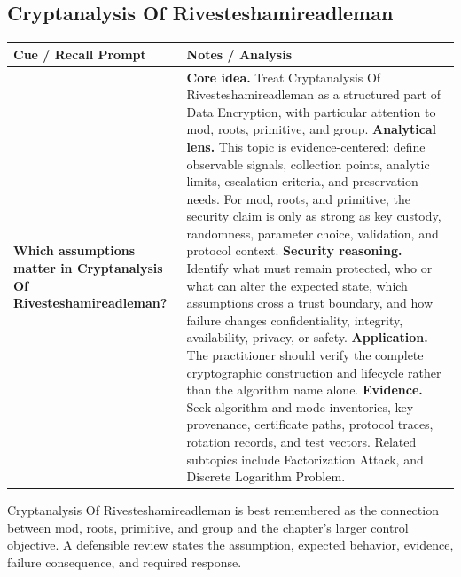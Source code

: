 \documentclass[11pt]{article}
\newcommand{\CornellHeader}{%
\rowcolor{Navy}\color{white}\bfseries Cue / Recall Prompt & \color{white}\bfseries Notes / Analysis\\\hline}
\newcommand{\CornellRow}[2]{%
\cellcolor{CueGray}\RaggedRight\textbf{#1} & \RaggedRight #2\\\hline}
\begin{document}
\subsection*{Cryptanalysis Of Rivesteshamireadleman}
\begin{longtable}{>{\RaggedRight\arraybackslash}p{}|>{\RaggedRight\arraybackslash}p{}}
\CornellHeader
\CornellRow{Which assumptions matter in Cryptanalysis Of Rivesteshamireadleman?}{\textbf{Core idea.} Treat Cryptanalysis Of Rivesteshamireadleman as a structured part of Data Encryption, with particular attention to mod, roots, primitive, and group. \textbf{Analytical lens.} This topic is evidence-centered: define observable signals, collection points, analytic limits, escalation criteria, and preservation needs. For mod, roots, and primitive, the security claim is only as strong as key custody, randomness, parameter choice, validation, and protocol context. \textbf{Security reasoning.} Identify what must remain protected, who or what can alter the expected state, which assumptions cross a trust boundary, and how failure changes confidentiality, integrity, availability, privacy, or safety. \textbf{Application.} The practitioner should verify the complete cryptographic construction and lifecycle rather than the algorithm name alone. \textbf{Evidence.} Seek algorithm and mode inventories, key provenance, certificate paths, protocol traces, rotation records, and test vectors. Related subtopics include Factorization Attack, and Discrete Logarithm Problem.}
\end{longtable}
\begin{topicsummary}
Cryptanalysis Of Rivesteshamireadleman is best remembered as the connection between mod, roots, primitive, and group and the chapter's larger control objective. A defensible review states the assumption, expected behavior, evidence, failure consequence, and required response.
\end{topicsummary}
\end{document}
